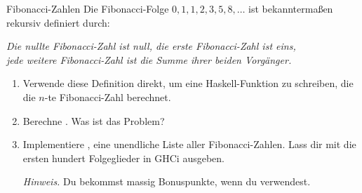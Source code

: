 \documentclass{uebblatt}
\begin{document}
\begin{aufgabe}{Fibonacci-Zahlen}
  Die Fibonacci-Folge $0, 1, 1, 2, 3, 5, 8, \ldots$ ist bekanntermaßen rekursiv definiert durch:
  \begin{center}
    \emph{Die nullte Fibonacci-Zahl ist null, die erste Fibonacci-Zahl ist eins, \\
    jede weitere Fibonacci-Zahl ist die Summe ihrer beiden Vorgänger.}
  \end{center}
  \begin{enumerate}
    \item Verwende diese Definition direkt, um eine Haskell-Funktion  zu schreiben, die die $n$-te Fibonacci-Zahl berechnet.
    \item Berechne . Was ist das Problem?
    \item Implementiere , eine unendliche Liste aller Fibonacci-Zahlen. Lass dir mit  die ersten hundert Folgeglieder in GHCi ausgeben. \\
    {\scriptsize \emph{Hinweis.} Du bekommst massig Bonuspunkte, wenn du  verwendest.\par}
  \end{enumerate}
\end{aufgabe}
\end{document}
